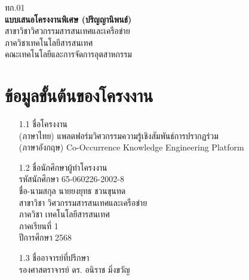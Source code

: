 \documentclass[12pt,a4paper]{article}
\newcommand{\textlight}[1]{{\thailightfont #1}}
\begin{document}
\begin{center}
\hfill\textlight{ทก.01}\\[1cm]
\large\textbf{แบบเสนอโครงงานพิเศษ (ปริญญานิพนธ์)}\\[0.3cm]
\normalsize\textlight{สาขาวิชาวิศวกรรมสารสนเทศและเครือข่าย}\\[0.1cm]
\normalsize\textlight{ภาควิชาเทคโนโลยีสารสนเทศ}\\[0.1cm]
\normalsize\textlight{คณะเทคโนโลยีและการจัดการอุตสาหกรรม}\\[0.1cm]
\end{center}

\thispagestyle{empty}
\vspace{0.5cm}

\section{ข้อมูลขั้นต้นของโครงงาน}
\begin{enumerate}[leftmargin=2cm]
\small
    \item[1.1] ชื่อโครงงาน
    \\ \textlight{(ภาษาไทย)} \hspace{0.5cm} {แพลตฟอร์มวิศวกรรมความรู้เชิงสัมพันธ์การปรากฏร่วม}
    \\ \textlight{(ภาษาอังกฤษ)} \hspace{0.04cm} {Co-Occurrence Knowledge Engineering Platform}

    \item[1.2] ชื่อนักศึกษาผู้ทำโครงงาน
    \\ \textlight{รหัสนักศึกษา} \hspace{0.3cm} {65-060226-2002-8}
    \\ \textlight{ชื่อ-นามสกุล} \hspace{0.4cm} {นายยงยุทธ ชวนขุนทด}
    \\ \textlight{สาขาวิชา} \hspace{0.935cm} {วิศวกรรมสารสนเทศและเครือข่าย}
    \\ \textlight{ภาควิชา} \hspace{1.12cm} {เทคโนโลยีสารสนเทศ}
    \\ \textlight{ภาคเรียนที่} \hspace{0.7cm} {1}
    \\ \textlight{ปีการศึกษา} \hspace{0.67cm} {2568}

    \item[1.3] ชื่ออาจารย์ที่ปรึกษา
    \\ {รองศาสตราจารย์ ดร. อนิราช มิ่งขวัญ}
\end{enumerate}
\end{document}
